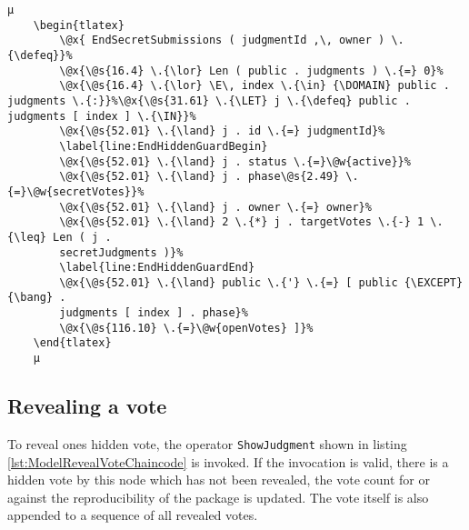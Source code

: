 \begin{lstlisting}[caption=Chaincode stopping submissions of hidden votes, label=lst:ModelEndHiddenChaincode]
	µ
	\begin{tlatex}
        \@x{ EndSecretSubmissions ( judgmentId ,\, owner ) \.{\defeq}}%
        \@x{\@s{16.4} \.{\lor} Len ( public . judgments ) \.{=} 0}%
        \@x{\@s{16.4} \.{\lor} \E\, index \.{\in} {\DOMAIN} public . judgments \.{:}}%\@x{\@s{31.61} \.{\LET} j \.{\defeq} public . judgments [ index ] \.{\IN}}%
        \@x{\@s{52.01} \.{\land} j . id \.{=} judgmentId}%
        \label{line:EndHiddenGuardBegin}
        \@x{\@s{52.01} \.{\land} j . status \.{=}\@w{active}}%
        \@x{\@s{52.01} \.{\land} j . phase\@s{2.49} \.{=}\@w{secretVotes}}%
        \@x{\@s{52.01} \.{\land} j . owner \.{=} owner}%
        \@x{\@s{52.01} \.{\land} 2 \.{*} j . targetVotes \.{-} 1 \.{\leq} Len ( j .
        secretJudgments )}%
        \label{line:EndHiddenGuardEnd}
        \@x{\@s{52.01} \.{\land} public \.{'} \.{=} [ public {\EXCEPT} {\bang} .
        judgments [ index ] . phase}%
        \@x{\@s{116.10} \.{=}\@w{openVotes} ]}%
    \end{tlatex}
    µ
\end{lstlisting}

\subsection{Revealing a vote}
\label{subsec:ModelRevealVoteChaincode}

To reveal ones hidden vote, the operator \texttt{ShowJudgment} shown in listing \ref{lst:ModelRevealVoteChaincode} is invoked. If the invocation is valid, \ie there is a hidden vote by this node which has not been revealed, the vote count for or against the reproducibility of the package is updated. The vote itself is also appended to a sequence of all revealed votes.

